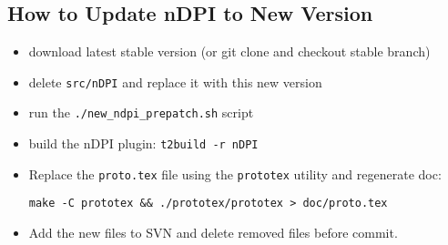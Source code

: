\documentclass[documentation]{subfiles}
\begin{document}
\subsection{How to Update nDPI to New Version}

\begin{itemize}
    \item download latest stable version (or git clone and checkout stable branch)
    \item delete {\tt src/nDPI} and replace it with this new version
    \item run the {\tt ./new\_ndpi\_prepatch.sh} script
    \item build the nDPI plugin: {\tt t2build -r nDPI}
    \item Replace the {\tt proto.tex} file using the {\tt prototex} utility and regenerate doc:
        \begin{center}
            {\tt make -C prototex \&\& ./prototex/prototex > doc/proto.tex}
        \end{center}
    \item Add the new files to SVN and delete removed files before commit.
\end{itemize}
\end{document}
